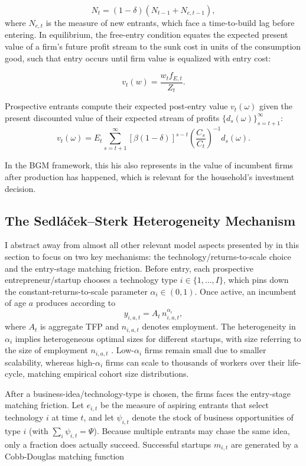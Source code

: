 \documentclass[a4paper,12pt]{article} %
\numberwithin{equation}{section} %
\numberwithin{figure}{section}
\numberwithin{table}{section}
\begin{document}
    \[
    N_t = (1-\delta)(N_{t-1} + N_{e,t-1}),
    \]
where $N_{e,t}$ is the measure of new entrants, which face a time-to-build lag before entering. In equilibrium, the free-entry condition equates the expected present value of a firm's
future profit stream to the sunk cost in units of the consumption good, such that entry occurs until firm value is equalized with entry cost:

\[
    v_t(w) = \frac{w_t f_{E,t}}{Z_t}.
\]

Prospective entrants compute their expected post-entry value $v_t(\omega)$ given the present discounted value of their expected stream of profits
$\{d_s(\omega)\}_{s=t+1}^\infty$: 
$$v_{t}(\omega) = E_t \sum_{s = t+1}^{\infty} \left[ \beta (1 - \delta) \right]^{s - t} \left( \frac{C_{s}}{C_{t}} \right)^{-1} d_{s}(\omega).$$

In the BGM framework, this his also represents in the value of incumbent firms after production has happened, which is relevant for the household's investment decision.



\subsection{The Sedláček–Sterk Heterogeneity Mechanism}
\label{sec:model-sedlacek}

I abstract away from almost all other relevant model aspects presented by \textcite{sedlavcek2017growth} 
in this section to focus on two key mechanisms: the technology/returns-to-scale choice and the entry-stage 
matching friction. Before entry, each prospective entrepreneur/startup chooses a technology type $i\in\{1,\dots,I\}$,
which pins down the constant-returns-to-scale parameter $\alpha_i\in(0,1)$. Once active, an incumbent of age $a$ 
produces according to 
\[
y_{i,a,t}=A_t\,n_{i,a,t}^{\alpha_i},
\]
where $A_t$ is aggregate TFP and $n_{i,a,t}$ denotes employment. The heterogeneity in $\alpha_i$ implies 
heterogeneous optimal sizes for different startups, with size referring to the size of employment $n_{i,a,t}$ . Low-$\alpha_i$ firms remain small due to smaller scalability, whereas high-$\alpha_i$ firms can scale 
to thousands of workers over their life-cycle, matching empirical cohort size distributions. 

After a business-idea/technology-type is chosen, the firms faces the entry-stage matching friction. Let $e_{i,t}$ be
the measure of aspiring entrants that select technology $i$ at time $t$, and let $\psi_{i,t}$ denote the stock 
of business opportunities of type $i$ (with $\sum_i\psi_{i,t}=\Psi$). Because multiple entrants may chase the same idea, only
a fraction does actually succeed. Successful startups $m_{i,t}$ are generated by a Cobb-Douglas matching function
\end{document}
